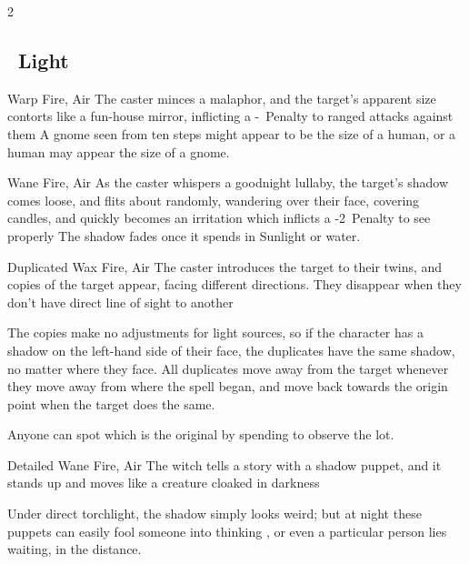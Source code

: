 \begin{multicols}{2}

\subsection[Light]{~Light}
\label{lightSpells}

  {}%
  {Warp}%
  {Fire, Air}%
  {}%
  {The caster minces a malaphor, and the target's apparent size contorts like a fun-house mirror, inflicting a -~Penalty to ranged attacks against them}%
  {A gnome seen from ten steps might appear to be the size of a human, or a human may appear the size of a gnome.}



  {}%
  {Wane}%
  {Fire, Air}%
  {}%
  {As the caster whispers a goodnight lullaby, the target's shadow comes loose, and flits about randomly, wandering over their face, covering candles, and quickly becomes an irritation which inflicts a -2~Penalty to see properly}%
  {The shadow fades once it spends  in Sunlight or water.}

  {Duplicated}%
  {Wax}%
  {Fire, Air}%
  {}%
  {The caster introduces the target to their twins, and  copies of the target appear, facing different directions.  They disappear when they don't have direct line of sight to another}%
  {The copies make no adjustments for light sources, so if the character has a shadow on the left-hand side of their face, the duplicates have the same shadow, no matter where they face.
  All duplicates move away from the target whenever they move away from where the \gls{spell} began, and move back towards the origin point when the target does the same.

  Anyone can spot which is the original by spending  to observe the lot.}

\setcounter{diceNo}{0}


  {Detailed}%
  {Wane}%
  {Fire, Air}%
  {}%
  {The \gls{witch} tells a story with a shadow puppet, and it stands up and moves like a creature cloaked in darkness}%
  {Under direct torchlight, the shadow simply looks weird; but at night these puppets can easily fool someone into thinking , or even a particular person lies waiting, in the distance.

}
\end{multicols}
